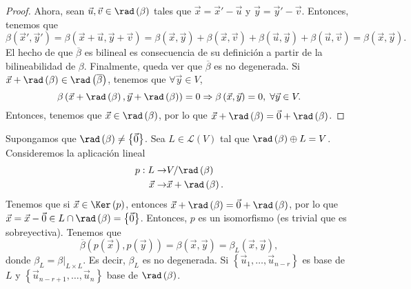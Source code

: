 \begin{proof}
Ahora, sean $\displaystyle \vec{u}, \vec{v} \in\rad\left(\beta \right) $ tales que $\displaystyle \vec{x} = \vec{x}'- \vec{u} $ y $\displaystyle \vec{y} = \vec{y}'-\vec{v} $. Entonces, tenemos que 
\[
	\beta\left(\vec{x}', \vec{y}'\right) =  \beta\left(\vec{x} + \vec{u}, \vec{y} + \vec{v}\right) = \beta\left(\vec{x}, \vec{y}\right) + \beta\left(\vec{x}, \vec{v}\right) + \beta\left(\vec{u}, \vec{y}\right) + \beta\left(\vec{u}, \vec{v}\right) = \beta\left(\vec{x}, \vec{y}\right) .
\]
El hecho de que $\displaystyle \overline{\beta } $ es bilineal es consecuencia de su definición a partir de la bilineabilidad de $\displaystyle \beta  $. Finalmente, queda ver que $\displaystyle \overline{\beta } $ es no degenerada. Si $\displaystyle \vec{x} + \rad\left(\beta \right) \in \rad\left(\overline{\beta } \right) $, tenemos que $\displaystyle \forall \vec{y}\in V $, 
\[ \beta\left(\vec{x} + \rad\left(\beta \right), \vec{y} + \rad\left(\beta \right)\right) =0 \Rightarrow \beta\left(\vec{x}, \vec{y}\right) = 0, \; \forall \vec{y} \in V .\]
Entonces, tenemos que $\displaystyle \vec{x} \in \rad\left(\beta \right) $, por lo que $\displaystyle \vec{x} + \rad\left(\beta \right) = \vec{0} + \rad\left(\beta\right) $.
\end{proof}
Supongamos que $\displaystyle \rad\left(\beta \right) \neq \left\{ \vec{0}\right\}  $. Sea $\displaystyle L \in \mathcal{L}\left(V\right) $ tal que $\displaystyle \rad\left(\beta \right)\oplus L = V $. Consideremos la aplicación lineal 
\[
\begin{split}
	p : L \to & V/\rad\left(\beta \right) \\
	\vec{x} \to & \vec{x} + \rad\left(\beta \right).
\end{split}
\]
Tenemos que si $\displaystyle \vec{x} \in \Ker\left(p\right) $, entonces $\displaystyle \vec{x} + \rad\left(\beta \right) = \vec{0} + \rad\left(\beta \right) $, por lo que $\displaystyle \vec{x} = \vec{x}- \vec{0} \in L \cap \rad\left(\beta \right) = \left\{ \vec{0}\right\}  $. Entonces, $\displaystyle p $ es un isomorfismo (es trivial que es sobreyectiva).
Tenemos que 
\[ \overline{\beta }\left(p\left(\vec{x}\right), p\left(\vec{y}\right)\right) = \beta\left(\vec{x}, \vec{y}\right) = \beta_{L}\left(\vec{x}, \vec{y}\right) ,\]
donde $\displaystyle \beta_{L} = \beta|_{L \times L} $. Es decir, $\displaystyle \beta_{L} $ es no degenerada. Si $\displaystyle \left\{ \vec{u}_{1}, \ldots, \vec{u}_{n-r}\right\}  $ es base de $\displaystyle L $ y $\displaystyle \left\{ \vec{u}_{n-r+1}, \ldots, \vec{u}_{n}\right\}  $ base de $\displaystyle \rad\left(\beta \right) $. 
